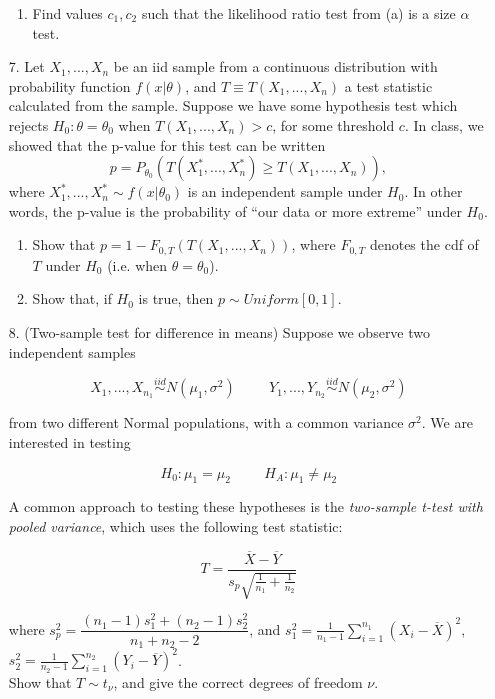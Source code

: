 \documentclass[11pt]{article}
\begin{document}
\begin{enumerate}
\begin{enumerate}
\item Find values $c_1, c_2$ such that the likelihood ratio test from (a) is a size $\alpha$ test.
\end{enumerate}


\item[7.] Let $X_1,...,X_n$ be an iid sample from a continuous distribution with probability function $f(x|\theta)$, and $T \equiv T(X_1,...,X_n)$ a test statistic calculated from the sample. Suppose we have some hypothesis test which rejects $H_0: \theta = \theta_0$ when $T(X_1,...,X_n) > c$, for some threshold $c$. In class, we showed that the p-value for this test can be written
$$p = P_{\theta_0}(T(X_1^*,...,X_n^*) \geq T(X_1,...,X_n)),$$
where $X_1^*,...,X_n^* \sim f(x|\theta_0)$ is an independent sample under $H_0$. In other words, the p-value is the probability of ``our data or more extreme'' under $H_0$.

\begin{enumerate}
\item Show that $p = 1 - F_{0,T}(T(X_1,...,X_n))$, where $F_{0,T}$ denotes the cdf of $T$ under $H_0$ (i.e. when $\theta = \theta_0$).

\item Show that, if $H_0$ is true, then $p \sim Uniform[0,1]$.
\end{enumerate}

\item[8.] (Two-sample test for difference in means) Suppose we observe two independent samples

$$X_1,...,X_{n_1} \overset{iid}{\sim} N(\mu_1, \sigma^2) \hspace{1cm} Y_1,...,Y_{n_2} \overset{iid}{\sim} N(\mu_2, \sigma^2)$$

from two different Normal populations, with a common variance $\sigma^2$. We are interested in testing 

$$H_0: \mu_1 = \mu_2 \hspace{1cm} H_A: \mu_1 \neq \mu_2$$

A common approach to testing these hypotheses is the \textit{two-sample t-test with pooled variance}, which uses the following test statistic:

$$T = \frac{\overline{X} - \overline{Y}}{s_p\sqrt{ \frac{1}{n_1} + \frac{1}{n_2}}}$$

where $s_p^2 = \dfrac{(n_1 - 1)s_1^2 + (n_2 - 1)s_2^2}{n_1 + n_2 - 2}$, and $s_1^2 = \frac{1}{n_1 - 1} \sum \limits_{i=1}^{n_1} (X_i - \overline{X})^2$, $s_2^2 = \frac{1}{n_2 - 1} \sum \limits_{i=1}^{n_2} (Y_i - \overline{Y})^2$.\\

Show that $T \sim t_\nu$, and give the correct degrees of freedom $\nu$.

\end{enumerate}
\end{document}
